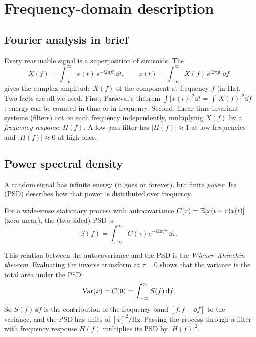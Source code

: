 \section{Frequency-domain description}

\subsection{Fourier analysis in brief}

Every reasonable signal is a superposition of sinusoids. The 
\begin{equation}
  X(f) = \int_{-\infty}^{\infty}x(t)\,e^{-i2\pi ft}\,\dd t, \qquad x(t) = \int_{-\infty}^{\infty}X(f)\,e^{i2\pi ft}\,\dd f
\end{equation}
gives the complex amplitude $X(f)$ of the component at frequency $f$ (in Hz). Two facts are all we need. First, Parseval's theorem
$\int|x(t)|^2\dd t = \int|X(f)|^2\dd f$: energy can be counted in time or in frequency. Second, linear time-invariant systems (filters) act
on each frequency independently, multiplying $X(f)$ by a \emph{frequency response} $H(f)$. A low-pass filter has $|H(f)| \approx 1$ at low
frequencies and $|H(f)| \approx 0$ at high ones.

\subsection{Power spectral density}

A random signal has infinite energy (it goes on forever), but finite \emph{power}. Its  (PSD) describes how that
power is distributed over frequency.

\begin{definition}
For a wide-sense stationary process with autocovariance $C(\tau) = \mathbb{E}[x(t + \tau)x(t)]$ (zero mean), the (two-sided) PSD is
\begin{equation}
  S(f) = \int_{-\infty}^{\infty}C(\tau)\,e^{-i2\pi f\tau}\,\dd\tau .
\end{equation}
\end{definition}

This relation between the autocovariance and the PSD is the \emph{Wiener--Khinchin theorem}. Evaluating the inverse transform at $\tau = 0$ shows
that the variance is the total area under the PSD:
\begin{equation}
  \operatorname{Var}(x) = C(0) = \int_{-\infty}^\infty S(f)\,\mathrm{d} f .
\end{equation}
So $S(f)\,\dd f$ is the contribution of the frequency band $[f, f + \dd f]$ to the variance, and the PSD has units of $[x]^2/\mathrm{Hz}$. Passing
the process through a filter with frequency response $H(f)$ multiplies its PSD by $|H(f)|^2$.

